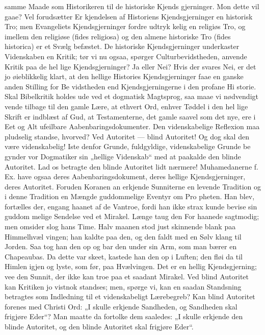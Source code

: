 \documentclass[12pt]{book}
\newcommand{\opage}[1]{\marginnote{\footnotesize\textit{[#1]}}}
\begin{document}
samme Maade som Historikeren til de historiske Kjends\-%
gjerninger. Mon dette vil gaae? Vel forudsætter Er\-%
kjendelsen af Historiens Kjendsgjerninger en historisk
Tro; men Evangeliets Kjendsgjerninger fordre udtryk\-%
kelig en religiøs Tro, og imellem den religiøse (fides
religiosa) og den almene historiske Tro (fides historica)
er et Svælg befæstet. De historiske Kjendsgjerninger
underkaster Videnskaben en Kritik; tør vi nu ogsaa,
spørger Culturbevidstheden, anvende Kritik paa de hel\-%
lige Kjendsgjerninger? Ja eller Nei? Hvis der svares
Nei, er det jo øieblikkelig klart, at den hellige Histories
Kjendsgjerninger faae en ganske anden Stilling for Be\-%
vidstheden end Kjendsgjerningerne i den profane Hi\-%
storie. Skal Bibelkritik holdes ude ved et dogmatisk
Magtsprog, saa maae vi nødvendigt vende tilbage til den
gamle Lære, at ethvert Ord, enhver Tøddel i den hel\-%
lige Skrift er indblæst af Gud, at Testamenterne, det
gamle saavel som det nye, ere i Eet og Alt ufeilbare
Aabenbaringsdokumenter. Den videnskabelige Reflexion
maa pludselig standse, hvorved? Ved Autoritet --- blind
Autoritet! Og dog skal den være videnskabelig! Iste\-%
denfor Grunde, fuldgyldige, videnskabelige Grunde be\-%
gynder vor Dogmatiker sin „hellige Videnskab“ med at
paakalde den blinde Autoritet. Lad os betragte den
blinde Autoritet lidt nærmere! Muhamedanerne f. Ex.
have ogsaa deres Aabenbaringsdokument, deres hellige
Kjendsgjerninger, deres Autoritet. Foruden Koranen an\-%
erkjende Sunniterne en levende Tradition og i denne
Tradition en Mængde guddommelige Eventyr om Pro\-%
pheten. Han blev, fortælles der, engang haanet af de
Vantroe, fordi han ikke strax kunde bevise sin guddom\-%
melige Sendelse ved et Mirakel. Længe taug den For\-%
haanede sagtmodig; men omsider slog hans Time. Halv\-%
\opage{83}\setcounter{footnote}{0}%
maanen stod just skinnende blank paa Himmelhvæl\-%
vingen; han kaldte paa den, og den faldt med en Sølv\-%
klang til Jorden. Saa tog han den op og bar den under
sin Arm, som man bærer en Chapeaubas. Da dette var
skeet, kastede han den op i Luften; den fløi da til
Himlen igjen og lyste, som før, paa Hvælvingen. Det
er en hellig Kjendsgjerning; vee den Sunnit, der ikke
kan troe paa et saadant Mirakel. Ved blind Autoritet
kan Kritiken jo vistnok standses; men, spørge vi, kan
en saadan Standsning betragtes som Indledning til et
videnskabeligt Lærebegreb? Kan blind Autoritet forenes
med Christi Ord: „I skulle erkjende Sandheden, og
Sandheden skal frigjøre Eder“? Man maatte da fortolke
dem saaledes: „I skulle erkjende den blinde Autoritet,
og den blinde Autoritet skal frigjøre Eder“.
\end{document}
